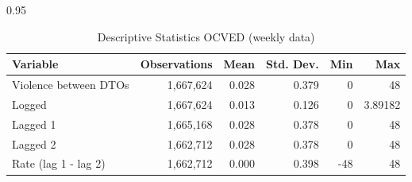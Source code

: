 \documentclass[12pt,letterpaper]{article}
\begin{document}
\begin{table}[h!]
\small
    \caption{Descriptive Statistics OCVED (weekly data)}
    \label{tab:descriptive_OCVED}
\begin{spacing}{0.95}
    \centering
    \begin{tabular}{lrrrrr}
    \hline
    

	Variable       	&	Observations	&	Mean	&	Std. Dev.	&	Min	&	Max	 \\	\hline
													
	Violence between DTOs	&	 1,667,624 	&	0.028	&	0.379	&	0	&	48	 \\
	\hspace{1em} Logged	&	 1,667,624 	&	0.013	&	0.126	&	0	&	3.89182	 \\
	\hspace{1em} Lagged 1 	&	 1,665,168 	&	0.028	&	0.378	&	0	&	48	 \\
	\hspace{1em} Lagged 2 	&	 1,662,712 	&	0.028	&	0.378	&	0	&	48	 \\
    \hspace{1em} Rate (lag 1 - lag 2)	&	 1,662,712 	&	0.000	&	0.398	&	-48	&	48	 \\
		

\end{tabular}
\end{spacing}
\end{table}
\end{document}
